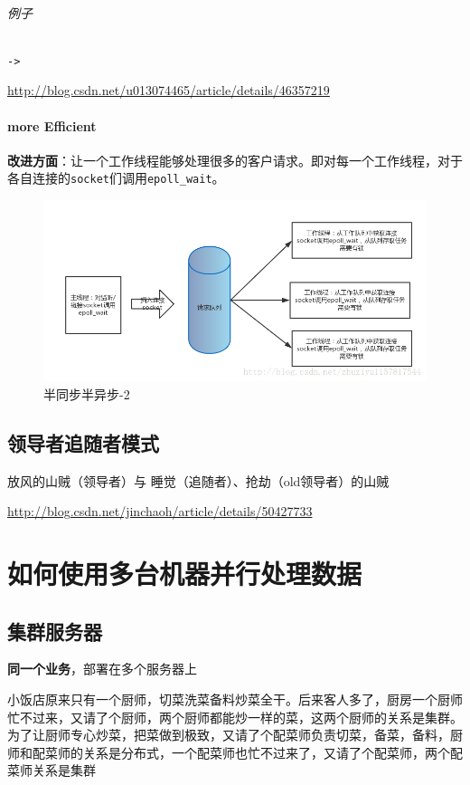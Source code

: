 \documentclass[UTF8,a4paper,8pt]{ctexbook}
\begin{document}
				\subparagraph{例子}\verb|->| 
				
					\url{http://blog.csdn.net/u013074465/article/details/46357219}
			\subsubsection{more Efficient}
				\textbf{改进方面}：让一个工作线程能够处理很多的客户请求。即对每一个工作线程，对于各自连接的\verb|socket|们调用\verb|epoll_wait|。
				
				\begin{figure}[h]
					\centering
					\includegraphics[scale = 0.5]{half2.png}
					\caption{半同步半异步-2}
				\end{figure}
	
	\section{领导者追随者模式}
		放风的山贼（领导者）与 睡觉（追随者）、抢劫（old领导者）的山贼
		
		\url{http://blog.csdn.net/jinchaoh/article/details/50427733}
	
\chapter{如何使用多台机器并行处理数据}
	\section{集群服务器}
			\textbf{同一个业务}，部署在多个服务器上
			
			小饭店原来只有一个厨师，切菜洗菜备料炒菜全干。后来客人多了，厨房一个厨师忙不过来，又请了个厨师，两个厨师都能炒一样的菜，这两个厨师的关系是集群。为了让厨师专心炒菜，把菜做到极致，又请了个配菜师负责切菜，备菜，备料，厨师和配菜师的关系是分布式，一个配菜师也忙不过来了，又请了个配菜师，两个配菜师关系是集群
			
\end{document}
